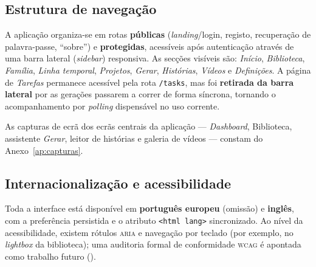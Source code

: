 \subsection{Estrutura de navegação}

A aplicação organiza-se em rotas \textbf{públicas} (\emph{landing}/login,
registo, recuperação de palavra-passe, ``sobre'') e \textbf{protegidas},
acessíveis após autenticação através de uma barra lateral
(\emph{sidebar}) responsiva. As secções visíveis são: \emph{Início},
\emph{Biblioteca}, \emph{Família}, \emph{Linha temporal}, \emph{Projetos},
\emph{Gerar}, \emph{Histórias}, \emph{Vídeos} e \emph{Definições}. A página
de \emph{Tarefas} permanece acessível pela rota \texttt{/tasks}, mas foi
\textbf{retirada da barra lateral} por as gerações passarem a correr de
forma síncrona, tornando o acompanhamento por \emph{polling} dispensável no
uso corrente.

As capturas de ecrã dos ecrãs centrais da aplicação --- \emph{Dashboard},
Biblioteca, assistente \emph{Gerar}, leitor de histórias e galeria de
vídeos --- constam do Anexo~\ref{ap:capturas}.

\subsection{Internacionalização e acessibilidade}

Toda a interface está disponível em \textbf{português europeu} (omissão)
e \textbf{inglês}, com a preferência persistida e o atributo
\texttt{<html lang>} sincronizado. Ao nível da acessibilidade, existem
rótulos \textsc{aria} e navegação por teclado (por exemplo, no
\emph{lightbox} da biblioteca); uma auditoria formal de conformidade
\textsc{wcag} é apontada como trabalho futuro ().
